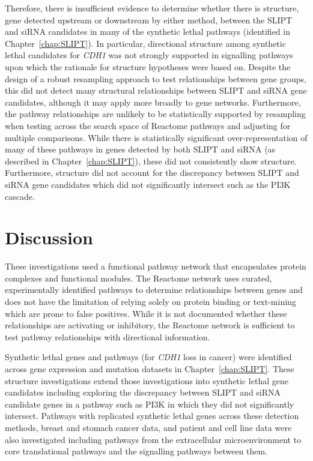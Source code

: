 
Therefore, there is insufficient evidence to determine whether there is  structure, gene detected upstream or downstream by either method, between the \gls{SLIPT} and \gls{siRNA} candidates in many of the \gls{synthetic lethal} pathways (identified in Chapter~\ref{chap:SLIPT}). In particular, directional structure among \gls{synthetic lethal} candidates for \textit{CDH1} was not strongly supported in signalling pathways upon which the rationale for  structure hypotheses were based on. Despite the design of a robust resampling approach to test relationships between gene groups, this did not detect many structural relationships between \gls{SLIPT} and \gls{siRNA} gene candidates, although it may apply more broadly to gene networks. Furthermore, the pathway relationships are unlikely to be statistically supported by resampling when testing across the search space of Reactome pathways and adjusting for multiple comparisons. While there is statistically significant over-representation of many of these pathways in genes detected by both \gls{SLIPT} and \gls{siRNA} (as described in Chapter~\ref{chap:SLIPT}), these did not consistently show  structure. Furthermore,  structure did not account for the discrepancy between \gls{SLIPT} and \gls{siRNA} gene candidates which did not significantly intersect such as the \gls{PI3K} cascade. 


\FloatBarrier

\section{Discussion}

These investigations used a functional pathway network that encapsulates protein complexes and functional modules. The Reactome network \citep{Reactome} uses curated, experimentally identified pathways to determine relationships between genes and does not have the limitation of relying solely on protein binding or text-mining which are prone to false positives. While it is not documented whether these relationships are activating or inhibitory, the Reactome network \citep{Reactome} is sufficient to test pathway relationships with directional information.

Synthetic lethal genes and pathways (for \textit{CDH1} loss in cancer) were identified across \gls{gene expression} and \gls{mutation} datasets in Chapter~\ref{chap:SLIPT}.
These  structure investigations extend those investigations into \gls{synthetic lethal} gene candidates including exploring the discrepancy between \gls{SLIPT} and \gls{siRNA} candidate genes in a pathway such as \gls{PI3K} in which they did not significantly intersect.
%
Pathways with replicated \gls{synthetic lethal} genes across these detection methods, breast and stomach cancer data, and patient and cell line data were also investigated including pathways from the extracellular microenvironment to core translational pathways and the signalling pathways between them.

